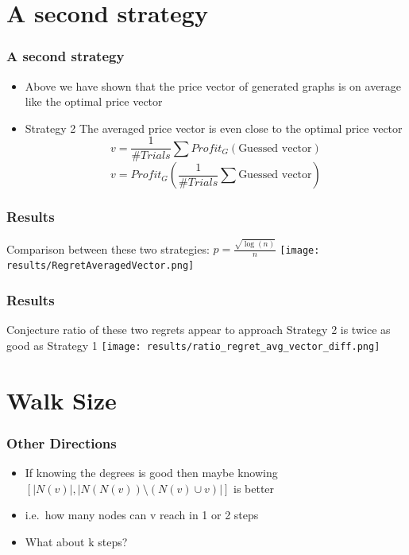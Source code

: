 \documentclass[a4paper,12pt]{beamer}
\begin{document}
\section{A second strategy}
\begin{frame}
  \frametitle{A second strategy}
  \begin{itemize}
    \item Above we have shown that the price vector of generated graphs is on average like the optimal price vector\\
    \item {\color{blue}Strategy 2} The averaged price vector is even close to the optimal price vector
          \begin{equation}
            v = \frac{1}{\# Trials} \sum Profit_{G} (\text{Guessed vector})
          \end{equation}
          \begin{equation}
            v = Profit_G ( \frac{1}{\# Trials} \sum \text{Guessed vector} )
          \end{equation}
  \end{itemize}
\end{frame}

\begin{frame}
  \frametitle{Results}
  Comparison between these two strategies: $p=\frac{\sqrt{\log(n)}}{n}$
  \texttt{[image: results/RegretAveragedVector.png]}
\end{frame}

\begin{frame}
  \frametitle{Results}
  Conjecture ratio of these two regrets appear to approach Strategy 2 is twice as good as Strategy 1
  \texttt{[image: results/ratio\_regret\_avg\_vector\_diff.png]}
\end{frame}

\section{Walk Size}
\begin{frame}
  \frametitle{Other Directions}
  \begin{itemize}
    \item If knowing the degrees is good then maybe knowing $\left[|N(v)|, |N(N(v))\setminus (N(v) \cup v ) |\right]$ is better\\
    \item i.e.\ how many nodes can v reach in 1 or 2 steps \\
    \item What about k steps?
  \end{itemize}
\end{frame}
\end{document}
